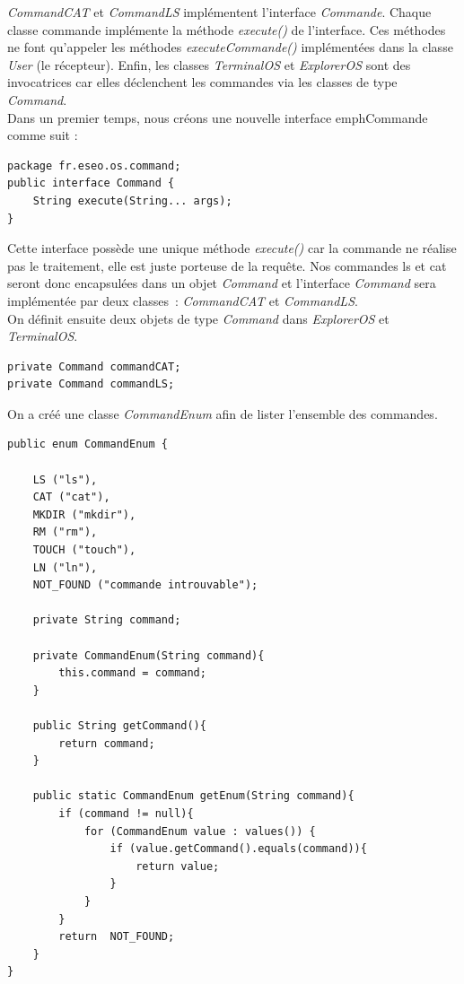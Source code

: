 \emph{CommandCAT} et \emph{CommandLS} implémentent l'interface \emph{Commande}. Chaque classe commande implémente la méthode \emph{execute()} de l'interface. Ces méthodes ne font qu'appeler les méthodes \emph{executeCommande()} implémentées dans la classe \emph{User} (le récepteur). Enfin, les classes \emph{TerminalOS} et \emph{ExplorerOS} sont des invocatrices car elles déclenchent les commandes via les classes de type \emph{Command}.\\

Dans un premier temps, nous créons une nouvelle interface emph{Commande} comme suit :

\begin{lstlisting}
package fr.eseo.os.command;
public interface Command {
    String execute(String... args);
}
\end{lstlisting}

Cette interface possède une unique méthode \emph{execute()} car la commande ne réalise pas le traitement, elle est juste porteuse de la requête.  Nos commandes ls et cat seront donc encapsulées dans un objet \emph{Command} et l’interface \emph{Command} sera implémentée par deux classes : \emph{CommandCAT} et \emph{CommandLS}.\\

On définit ensuite deux objets de type \emph{Command} dans \emph{ExplorerOS} et \emph{TerminalOS}.

\begin{lstlisting}
private Command commandCAT;
private Command commandLS;
\end{lstlisting}

On a créé une classe \emph{CommandEnum} afin de lister l'ensemble des commandes.

\begin{lstlisting}
public enum CommandEnum {

    LS ("ls"),
    CAT ("cat"),
    MKDIR ("mkdir"),
    RM ("rm"),
    TOUCH ("touch"),
    LN ("ln"),
    NOT_FOUND ("commande introuvable");

    private String command;

    private CommandEnum(String command){
        this.command = command;
    }

    public String getCommand(){
        return command;
    }

    public static CommandEnum getEnum(String command){
        if (command != null){
            for (CommandEnum value : values()) {
                if (value.getCommand().equals(command)){
                    return value;
                }
            }
        }
        return  NOT_FOUND;
    }
}
\end{lstlisting}

